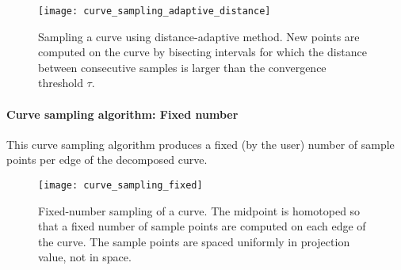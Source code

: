 \begin{center}
\begin{figure}[H]
\texttt{[image: curve\_sampling\_adaptive\_distance]}
\caption[Adaptive-distance curve sampling]{Sampling a curve using distance-adaptive method.  New points are computed on the curve by bisecting intervals for which the distance between consecutive samples is larger than the convergence threshold $\tau$.}
\end{figure}
\end{center}


\paragraph{Curve sampling algorithm: Fixed number}

This curve sampling algorithm produces a fixed (by the user) number of sample points per edge of the decomposed curve.  

\begin{center}
\begin{figure}[H]
\texttt{[image: curve\_sampling\_fixed]}
\caption[Fixed-number sampling of a curve -- how it works]{Fixed-number sampling of a curve.  The midpoint is homotoped so that a fixed number of sample points are computed on each edge of the curve.  The sample points are spaced uniformly in projection value, not in space.}
\end{figure}
\end{center}




